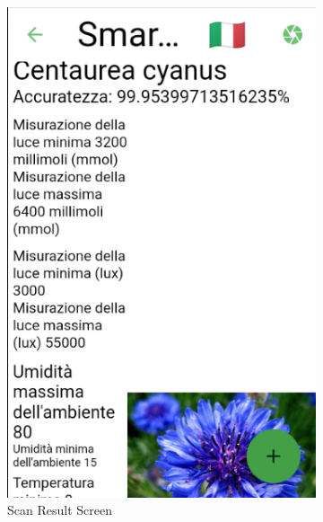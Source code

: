 \documentclass[a4paper,12pt]{report}
\begin{document}
\begin{figure}[H]
	
	\begin{subfigure}{0.3\textwidth}
		\includegraphics[width=\textwidth]{./images/scan_result/scan_result_screen.png}
		\caption{Scan Result Screen}
		\label{fig:scan_result}
	\end{subfigure}
	\hfill
	\begin{subfigure}{0.3\textwidth}

\end{subfigure}
\end{figure}
\end{document}
